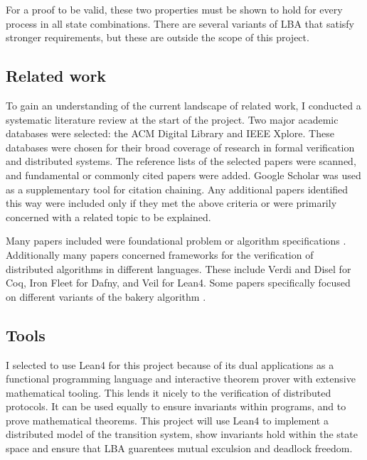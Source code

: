 \documentclass{article}
\theoremstyle{definition}
\begin{document}
        \noindent
        For a proof to be valid, these two properties must be shown to hold for every process in all state combinations. 
        There are several variants of LBA that satisfy stronger requirements, but these are outside the scope of this project.

    \subsection{Related work}
        To gain an understanding of the current landscape of related work, 
        I conducted a systematic literature review at the start of the project.
        Two major academic databases were selected: the ACM Digital Library and IEEE Xplore. 
        These databases were chosen for their broad coverage of research in formal verification and distributed systems.
        The reference lists of the selected papers were scanned, and fundamental or commonly cited papers were added.
        Google Scholar was used as a supplementary tool for citation chaining.
        Any additional papers identified this way were included only if they met the above criteria or were primarily concerned with a related topic to be explained.

        Many papers included were foundational problem or algorithm specifications \cite{dijkstraSolutionProblem1965}\cite{lamport_new_1974}\cite{lamportSafetyLivenessFairness}\cite{lamportByzantineGeneralsProblem2019}.
        Additionally many papers concerned frameworks for the verification of distributed algorithms in different languages. 
        These include Verdi \cite{wilcoxVerdiFrameworkImplementing2015} and Disel \cite{sergeyProgrammingProvingDistributed2017}
        for Coq, Iron Fleet \cite{hawblitzelIronFleetProvingPractical2015} for Dafny, and Veil \cite{pirleaVeilFrameworkAutomated2025a}
        for Lean4.
        Some papers specifically focused on different variants of the bakery algorithm \cite{hesselinkMechanicalVerificationLamports2013}\cite{hesselinkCorrectnessConcurrentComplexity2016}.


    \subsection{Tools}
        I selected to use Lean4 for this project because of its dual applications as a functional programming language and
        interactive theorem prover with extensive mathematical tooling.
        This lends it nicely to the verification of distributed protocols.
        It can be used equally to ensure invariants within programs, and to prove mathematical theorems. 
        This project will use Lean4 to implement a distributed model of the transition system, 
        show invariants hold within the state space and ensure that LBA guarentees mutual exculsion and deadlock freedom.
\end{document}
